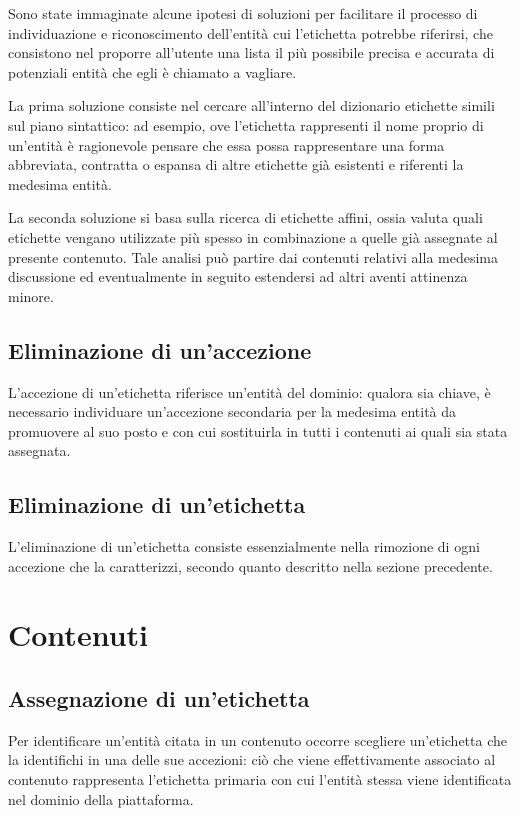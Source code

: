 \documentclass[10pt,a4paper,headinclude,footinclude,hidelinks]{scrreprt} %
\begin{document}
	Sono state immaginate alcune ipotesi di soluzioni per facilitare il processo di individuazione e riconoscimento dell'entità cui l'etichetta potrebbe riferirsi, che consistono nel proporre all'utente una lista il più possibile precisa e accurata di potenziali entità che egli è chiamato a vagliare.
 
	La prima soluzione consiste nel cercare all'interno del dizionario etichette simili sul piano sintattico: ad esempio, ove l'etichetta rappresenti il nome proprio di un'entità è ragionevole pensare che essa possa rappresentare una forma abbreviata, contratta o espansa di altre etichette già esistenti e riferenti la medesima entità. 

	La seconda soluzione si basa sulla ricerca di etichette affini, ossia valuta quali etichette vengano utilizzate più spesso in combinazione a quelle già assegnate al presente contenuto. Tale analisi può partire dai contenuti relativi alla medesima discussione ed eventualmente in seguito estendersi ad altri aventi attinenza minore.

	\subsection{Eliminazione di un'accezione}
	L'accezione di un'etichetta riferisce un'entità del dominio: qualora sia chiave, è necessario individuare un'accezione secondaria per la medesima entità da promuovere al suo posto e con cui sostituirla in tutti i contenuti ai quali sia stata assegnata.

	\subsection{Eliminazione di un'etichetta}
	L'eliminazione di un'etichetta consiste essenzialmente nella rimozione di ogni accezione che la caratterizzi, secondo quanto descritto nella sezione precedente.

	\section{Contenuti}
	\label{sec:stage:design:contenuti}

	\subsection{Assegnazione di un'etichetta}
	Per identificare un'entità citata in un contenuto occorre scegliere un'etichetta che la identifichi in una delle sue accezioni: ciò che viene effettivamente associato al contenuto rappresenta l'etichetta primaria con cui l'entità stessa viene identificata nel dominio della piattaforma.
\end{document}
